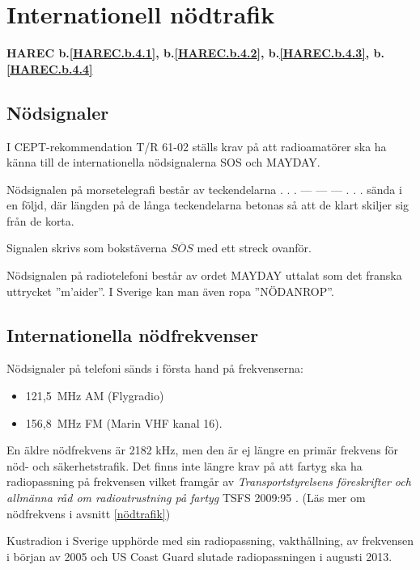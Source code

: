 \section{Internationell nödtrafik}
\textbf{
	HAREC b.\ref{HAREC.b.4.1}\label{myHAREC.b.4.1},
	b.\ref{HAREC.b.4.2}\label{myHAREC.b.4.2},
	b.\ref{HAREC.b.4.3}\label{myHAREC.b.4.3},
	b.\ref{HAREC.b.4.4}\label{myHAREC.b.4.4}
}

\subsection{Nödsignaler}

I CEPT-rekommendation T/R 61-02 \cite{TR6102} ställs krav på att radioamatörer
ska ha känna till de internationella nödsignalerna SOS och MAYDAY.

Nödsignalen på morsetelegrafi består av teckendelarna . . . --- --- --- . . .
sända i en följd, där längden på de långa teckendelarna betonas så att de klart
skiljer sig från de korta.

Signalen skrivs som bokstäverna $\overline{SOS}$ med ett streck ovanför.

Nödsignalen på radiotelefoni består av ordet MAYDAY uttalat som det franska
uttrycket ''m'aider''. I Sverige kan man även ropa ''NÖDANROP''.

\subsection{Internationella nödfrekvenser}

Nödsignaler på telefoni sänds i första hand på frekvenserna:
\begin{itemize}
	\item 121,5~MHz AM (Flygradio)
	\item 156,8~MHz FM (Marin VHF kanal 16).
\end{itemize}

En äldre nödfrekvens är 2182 kHz, men den är ej längre en primär frekvens för
nöd- och säkerhetstrafik.
Det finns inte längre krav på att fartyg ska ha radiopassning på frekvensen
vilket framgår av \emph{Transportstyrelsens föreskrifter och allmänna råd
	om radioutrustning på fartyg} TSFS 2009:95 \cite[\S22]{TSFS2009:95}.
(Läs mer om nödfrekvens i avsnitt \ref{nödtrafik})

Kustradion i Sverige upphörde med sin radiopassning, vakthållning, av frekvensen
i början av 2005 och US Coast Guard slutade radiopassningen i augusti 2013.

